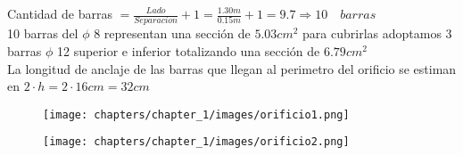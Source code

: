 \begin{enumerate}
\begin{itemize}
Cantidad de barras $ = \frac{Lado}{Separacion}+1 = \frac{1.30m}{0.15m} + 1 = 9.7 \Rightarrow 10 \quad barras$\\

10 barras del $\phi$ 8 representan una sección de $5.03cm^2$ para cubrirlas adoptamos 3 barras $\phi$ 12 superior e inferior totalizando una sección de $6.79cm^2$\\

La longitud de anclaje de las barras que llegan al perimetro del orificio se estiman en $2 \cdot h = 2 \cdot 16cm = 32cm$\\

\begin{figure}[H]
\begin{center}
     \texttt{[image: chapters/chapter\_1/images/orificio1.png]}
\end{center}
\end{figure}

\begin{figure}[H]
\begin{center}
     \texttt{[image: chapters/chapter\_1/images/orificio2.png]}
\end{center}
\end{figure}

\end{itemize}
\end{enumerate}